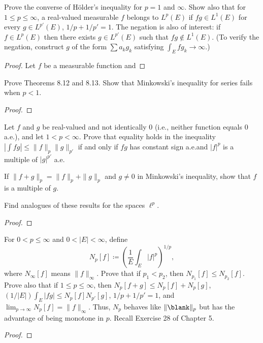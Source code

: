 
\begin{problem}
Prove the converse of Hölder's inequality for $p=1$ and $\infty$. Show also
that for $1\leq p\leq\infty$, a real-valued measurable $f$ belongs to
$L^p(E)$ if $fg\in L^1(E)$ for every $g\in L^{p'}(E)$, $1/p+1/p'=1$. The
negation is also of interest: if $f\in L^p(E)$ then there exists $g\in
L^{p'}(E)$ such that $fg\notin L^1(E)$. (To verify the negation, construct
$g$ of the form $\sum a_kg_k$ satisfying $\int_E fg_k\to\infty$.)
\end{problem}
\begin{proof}
Let $f$ be a measurable function and
\end{proof}
\newpage

\begin{problem}
Prove Theorems 8.12 and 8.13. Show that Minkowski’s inequality for series
fails when $p<1$.
\end{problem}
\begin{proof}
\end{proof}
\newpage

\begin{problem}
Let $f$ and $g$ be real-valued and not identically $0$ (i.e., neither
function equals $0$ a.e.), and let $1<p<\infty$. Prove that equality holds
in the inequality $\left|\int fg\right|\leq\|f\|_p\|g\|_{p'}$ if and only if
$fg$ has constant sign a.e.\@ and $|f|^p$ is a multiple of $|g|^{p'}$ a.e.

If $\|f+g\|_p=\|f\|_p+\|g\|_{p}$ and $g\neq 0$ in Minkowski's inequality,
show that $f$ is a multiple of $g$.

Find analogues of these results for the spaces $\ell^p$.
\end{problem}
\begin{proof}
\end{proof}
\newpage

\begin{problem}
For $0<p\leq\infty$ and $0<|E|<\infty$, define
\[
N_p[f]\coloneqq\left(\frac{1}{E}\int_E|f|^p\right)^{1/p},
\]
where $N_\infty[f]$ means $\|f\|_\infty$. Prove that if $p_1<p_2$, then
$N_{p_1}[f]\leq N_{p_2}[f]$. Prove also that if $1\leq p\leq \infty$, then
$N_p[f+g]\leq N_p[f]+N_p[g]$, $(1/|E|)\int_E|fg|\leq N_p[f]N_{p'}[g]$,
$1/p+1/p'=1$, and $\lim_{p\to\infty} N_p[f]=\|f\|_\infty$. Thus, $N_p$
behaves like $\|\blank\|_p$ but has the advantage of being monotone in
$p$. Recall Exercise 28 of Chapter 5.
\end{problem}
\begin{proof}
\end{proof}
\newpage

